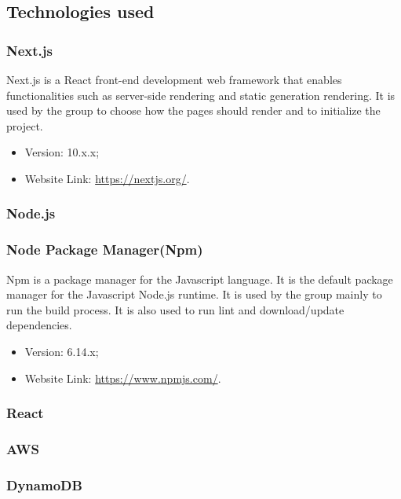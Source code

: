 \subsection{Technologies used}

\subsubsection{Next.js}
Next.js is a React front-end development web framework that enables functionalities such as server-side rendering and static generation rendering. It is used by the group to choose how the pages should render and to initialize the project.
\begin{itemize}
\item Version: 10.x.x;
\item Website Link: \url{https://nextjs.org/}.
\end{itemize}

\subsubsection{Node.js}


\subsubsection{Node Package Manager(Npm)}
Npm is a package manager for the Javascript language. It is the default package manager for the Javascript Node.js runtime. It is used by the group mainly to run the build process. It is also used to run lint and download/update dependencies.
\begin{itemize}
\item Version: 6.14.x;
\item Website Link: \url{https://www.npmjs.com/}.
\end{itemize}

\subsubsection{React}


\subsubsection{AWS}


\subsubsection{DynamoDB}


